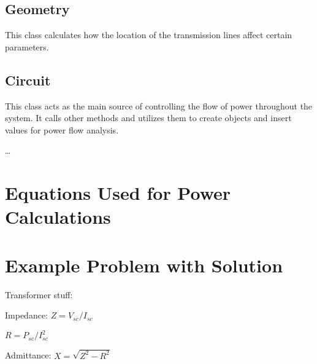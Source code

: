 \documentclass{article}
\begin{document}
	\subsection{Geometry}
	This class calculates how the location of the transmission lines affect certain parameters.
	
	\subsection{Circuit}
	This class acts as the main source of controlling the flow of power throughout the system. It calls other methods and utilizes them to create objects and insert values for power flow analysis.
	
	\dots
	
	\section{Equations Used for Power Calculations}
	
	\section{Example Problem with Solution}
	\noindent
	Transformer stuff:
	
	\noindent
	Impedance: $Z = V_{sc} / I_{sc}$
	
	\noindent
	$R = P_{sc} / I_{sc}^{2}$
	
	\noindent
	Admittance: $X = \sqrt{Z^{2} - R^{2}}$
	
	
	
\end{document}
